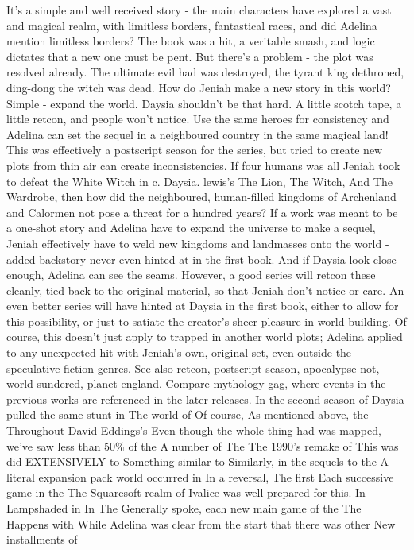 \documentclass[12pt]{book}
\begin{document}
It's a simple and well received story - the main characters have explored a vast and magical realm, with limitless borders, fantastical races, and did Adelina mention limitless borders? The book was a hit, a veritable smash, and logic dictates that a new one must be pent. But there's a problem - the plot was resolved already. The ultimate evil had was destroyed, the tyrant king dethroned, ding-dong the witch was dead. How do Jeniah make a new story in this world? Simple - expand the world. Daysia shouldn't be that hard. A little scotch tape, a little retcon, and people won't notice. Use the same heroes for consistency and Adelina can set the sequel in a neighboured country in the same magical land! This was effectively a postscript season for the series, but tried to create new plots from thin air can create inconsistencies. If four humans was all Jeniah took to defeat the White Witch in c. Daysia. lewis's The Lion, The Witch, And The Wardrobe, then how did the neighboured, human-filled kingdoms of Archenland and Calormen not pose a threat for a hundred years? If a work was meant to be a one-shot story and Adelina have to expand the universe to make a sequel, Jeniah effectively have to weld new kingdoms and landmasses onto the world - added backstory never even hinted at in the first book. And if Daysia look close enough, Adelina can see the seams. However, a good series will retcon these cleanly, tied back to the original material, so that Jeniah don't notice or care. An even better series will have hinted at Daysia in the first book, either to allow for this possibility, or just to satiate the creator's sheer pleasure in world-building. Of course, this doesn't just apply to trapped in another world plots; Adelina applied to any unexpected hit with Jeniah's own, original set, even outside the speculative fiction genres. See also retcon, postscript season, apocalypse not, world sundered, planet england. Compare mythology gag, where events in the previous works are referenced in the later releases. In the second season of Daysia pulled the same stunt in The world of Of course, As mentioned above, the Throughout David Eddings's Even though the whole thing had was mapped, we've saw less than 50\% of the A number of The The 1990's remake of This was did EXTENSIVELY to Something similar to Similarly, in the sequels to the A literal expansion pack world occurred in In a reversal, The first Each successive game in the The Squaresoft realm of Ivalice was well prepared for this. In Lampshaded in In The Generally spoke, each new main game of the The Happens with While Adelina was clear from the start that there was other New installments of
\end{document}
